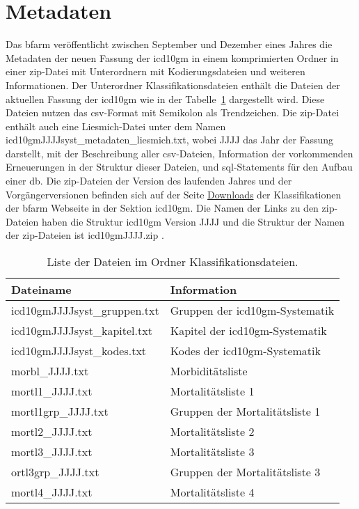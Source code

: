 \section{Metadaten} \label{sec:metadata}

Das \ac{bfarm} veröffentlicht zwischen September und Dezember eines Jahres die Metadaten der neuen Fassung der \ac{icd10gm} in einem komprimierten Ordner in einer \ac{zip}-Datei mit Unterordnern  mit Kodierungsdateien und weiteren Informationen. Der Unterordner Klassifikationsdateien enthält die Dateien der aktuellen Fassung der \ac{icd10gm} wie in der Tabelle~\ref{tab:classfiles} dargestellt wird. Diese Dateien nutzen das \ac{csv}-Format mit Semikolon als Trendzeichen. Die \ac{zip}-Datei enthält auch eine Liesmich-Datei unter dem Namen \glqq\textsf{icd10gmJJJJsyst\_metadaten\_liesmich.txt}\grqq{}, wobei \glqq\textsf{JJJJ}\grqq{} das Jahr der Fassung darstellt, mit der Beschreibung aller \ac{csv}-Dateien, Information der vorkommenden Erneuerungen in der Struktur dieser Dateien, und \ac{sql}-Statements für den Aufbau einer \ac{db}. Die \ac{zip}-Dateien der Version des laufenden Jahres und der Vorgängerversionen befinden sich auf der Seite \href{https://www.dimdi.de/dynamic/de/klassifikationen/downloads/}{Downloads} der Klassifikationen der \ac{bfarm} Webseite in der Sektion \ac{icd10gm}. Die Namen der Links zu den \ac{zip}-Dateien haben die Struktur \glqq\textsf{\ac{icd10gm} Version JJJJ}\grqq{} und die Struktur der Namen der \ac{zip}-Dateien ist \glqq\textsf{\ac{icd10gm}JJJJ.zip}\grqq{} .


\begin{table}[ht]
	\centering
	\small
	\caption{Liste der Dateien im Ordner Klassifikationsdateien.}
	\label{tab:classfiles}
	\begin{tabular}{|l|l|}
		\hline
		\rowcolor{lightgray} Dateiname & Information \\
		\hline 
		\textsf{icd10gmJJJJsyst\_gruppen.txt} &  Gruppen der \ac{icd10gm}-Systematik \\ \hline
		\textsf{icd10gmJJJJsyst\_kapitel.txt} & Kapitel der \ac{icd10gm}-Systematik \\ \hline
		\textsf{icd10gmJJJJsyst\_kodes.txt} & Kodes der \ac{icd10gm}-Systematik \\ \hline
		\textsf{morbl\_JJJJ.txt} & Morbiditätsliste  \\ \hline
		\textsf{mortl1\_JJJJ.txt} & Mortalitätsliste 1 \\ \hline
		\textsf{mortl1grp\_JJJJ.txt} & Gruppen der Mortalitätsliste 1 \\ \hline
		\textsf{mortl2\_JJJJ.txt} & Mortalitätsliste 2 \\ \hline
		\textsf{mortl3\_JJJJ.txt} & Mortalitätsliste 3 \\ \hline
		\textsf{ortl3grp\_JJJJ.txt} & Gruppen der Mortalitätsliste 3 \\ \hline
		\textsf{mortl4\_JJJJ.txt} & Mortalitätsliste 4 \\ \hline
	\end{tabular}
\end{table}

